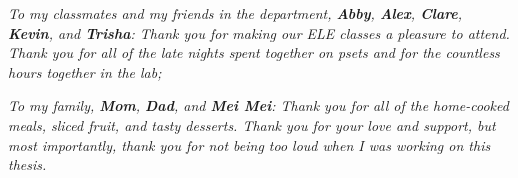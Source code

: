 \textit{To my classmates and my friends in the department, \textbf{Abby}, \textbf{Alex}, \textbf{Clare}, \textbf{Kevin}, and \textbf{Trisha}: Thank you for making our ELE classes a pleasure to attend. Thank you for all of the late nights spent together on psets and for the countless hours together in the lab;}

\textit{To my family, \textbf{Mom}, \textbf{Dad}, and \textbf{Mei Mei}: Thank you for all of the home-cooked meals, sliced fruit, and tasty desserts. Thank you for your love and support, but most importantly, thank you for not being too loud when I was working on this thesis.}